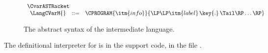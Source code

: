 \documentclass[7x10]{TimesAPriori_MIT}%
\numberwithin{theorem}{chapter}
\numberwithin{definition}{chapter}
\numberwithin{equation}{chapter}
\begin{document}
{\begin{figure}[tbp]
\begin{tcolorbox}[colback=white]
\[
\begin{array}{l}
  \CvarASTRacket \\
\begin{array}{lcl}
\LangCVarM{} & ::= & \CPROGRAM{\itm{info}}{\LP\LP\itm{label}\,\key{.}\,\Tail\RP\ldots\RP}
\end{array}
\end{array}
\]
\end{tcolorbox}
\caption{The abstract syntax of the \LangCVar{} intermediate language.}
\label{fig:c0-syntax}
\end{figure}

The definitional interpreter for \LangCVar{} is in the support code,
in the file .

\fi}
\end{document}
